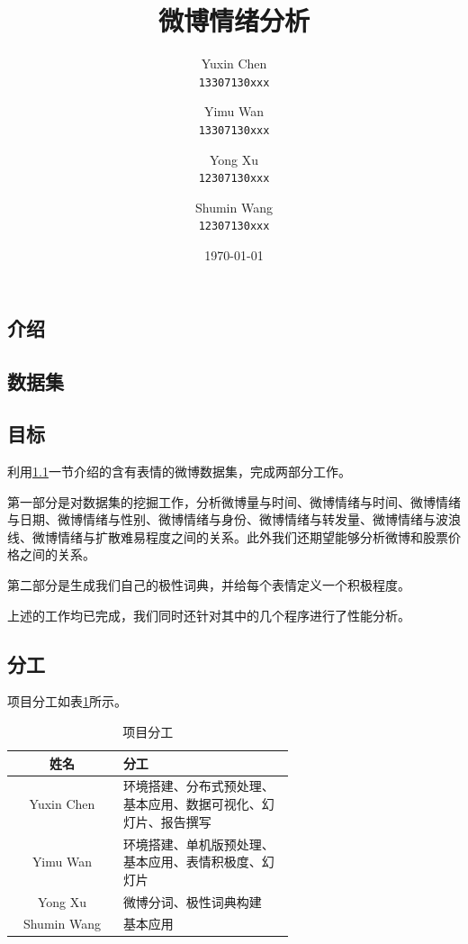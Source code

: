 \documentclass[12pt, oneside]{article}
\title{微博情绪分析}
\author{
	Yuxin Chen\\
	\texttt{13307130xxx}
	\and
	Yimu Wan\\
	\texttt{13307130xxx}
	\and
	Yong Xu\\
	\texttt{12307130xxx}
	\and
	Shumin Wang\\
	\texttt{12307130xxx}
}
\date{\today}
\begin{document}
\begin{spacing}{1.5}
\begin{CJK}{UTF8}{gbsn}

\maketitle


\newpage

\section{介绍}
\subsection{数据集}
\label{subsec:dataset}

\subsection{目标}
利用\ref{subsec:dataset}一节介绍的含有表情的微博数据集，完成两部分工作。

第一部分是对数据集的挖掘工作，分析微博量与时间、微博情绪与时间、微博情绪与日期、微博情绪与性别、微博情绪与身份、微博情绪与转发量、微博情绪与波浪线、微博情绪与扩散难易程度之间的关系。此外我们还期望能够分析微博和股票价格之间的关系。

第二部分是生成我们自己的极性词典，并给每个表情定义一个积极程度。

上述的工作均已完成，我们同时还针对其中的几个程序进行了性能分析。

\subsection{分工}
项目分工如表\ref{tbl:responsibilities}所示。

\begin{table}[]
\centering
\begin{tabular}{|c|p{0.618\linewidth}|}
\hline
姓名          & 分工                              \\ \hline
Yuxin Chen  & 环境搭建、分布式预处理、基本应用、数据可视化、幻灯片、报告撰写 \\ \hline
Yimu Wan    & 环境搭建、单机版预处理、基本应用、表情积极度、幻灯片      \\ \hline
Yong Xu     & 微博分词、极性词典构建                     \\ \hline
Shumin Wang & 基本应用                            \\ \hline
\end{tabular}
\caption{项目分工}
\label{tbl:responsibilities}
\end{table}


\end{CJK}
\end{spacing}
\end{document}
